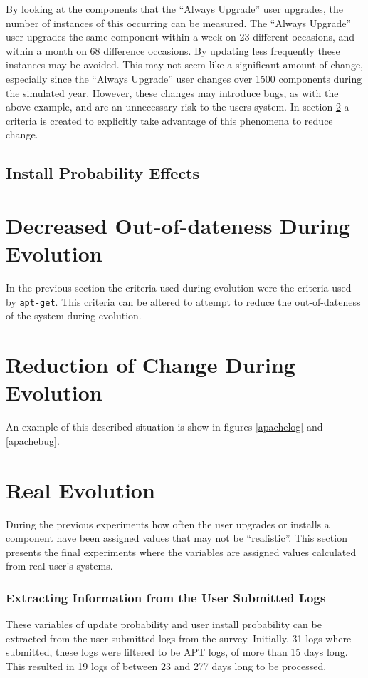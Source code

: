 By looking at the components that the ``Always Upgrade'' user upgrades, the number of instances of this occurring can be measured.
The ``Always Upgrade'' user upgrades the same component within a week on 23 different occasions, and within a month on 68 difference occasions.
By updating less frequently these instances may be avoided.
This may not seem like a significant amount of change, especially since the ``Always Upgrade'' user changes over 1500 components during the simulated year.
However, these changes may introduce bugs, as with the above example, and are an unnecessary risk to the users system.
In section \ref{exp.stable} a criteria is created to explicitly take advantage of this phenomena to reduce change.


\subsection{Install Probability Effects}

\section{Decreased Out-of-dateness During Evolution}
\label{exp.prouttdsection}
In the previous section the criteria used during evolution were the criteria used by \texttt{apt-get}.
This criteria can be altered to attempt to reduce the out-of-dateness of the system during evolution.


\section{Reduction of Change During Evolution}
\label{exp.stable}
An example of this described situation is show in figures \ref{apachelog} and \ref{apachebug}.




\section{Real Evolution}
During the previous experiments how often the user upgrades or installs a component have been assigned values that may not be ``realistic''.
This section presents the final experiments where the variables are assigned values calculated from real user's systems.


\subsubsection{Extracting Information from the User Submitted Logs}
These variables of update probability and user install probability can be extracted from the user submitted logs from the survey.
Initially, 31 logs where submitted, these logs were filtered to be APT logs, of more than 15 days long.
This resulted in 19 logs of between 23 and 277 days long to be processed.

